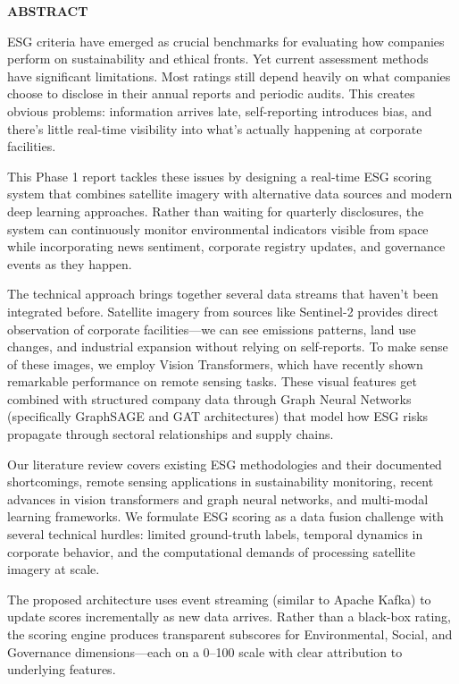 \begin{center}
\huge{\textbf{ABSTRACT}}
\end{center}

\vspace{1cm}

ESG criteria have emerged as crucial benchmarks for evaluating how companies perform on sustainability and ethical fronts. Yet current assessment methods have significant limitations. Most ratings still depend heavily on what companies choose to disclose in their annual reports and periodic audits. This creates obvious problems: information arrives late, self-reporting introduces bias, and there's little real-time visibility into what's actually happening at corporate facilities.

This Phase 1 report tackles these issues by designing a real-time ESG scoring system that combines satellite imagery with alternative data sources and modern deep learning approaches. Rather than waiting for quarterly disclosures, the system can continuously monitor environmental indicators visible from space while incorporating news sentiment, corporate registry updates, and governance events as they happen.

The technical approach brings together several data streams that haven't been integrated before. Satellite imagery from sources like Sentinel-2 provides direct observation of corporate facilities—we can see emissions patterns, land use changes, and industrial expansion without relying on self-reports. To make sense of these images, we employ Vision Transformers, which have recently shown remarkable performance on remote sensing tasks. These visual features get combined with structured company data through Graph Neural Networks (specifically GraphSAGE and GAT architectures) that model how ESG risks propagate through sectoral relationships and supply chains.

Our literature review covers existing ESG methodologies and their documented shortcomings, remote sensing applications in sustainability monitoring, recent advances in vision transformers and graph neural networks, and multi-modal learning frameworks. We formulate ESG scoring as a data fusion challenge with several technical hurdles: limited ground-truth labels, temporal dynamics in corporate behavior, and the computational demands of processing satellite imagery at scale.

The proposed architecture uses event streaming (similar to Apache Kafka) to update scores incrementally as new data arrives. Rather than a black-box rating, the scoring engine produces transparent subscores for Environmental, Social, and Governance dimensions—each on a 0–100 scale with clear attribution to underlying features.

